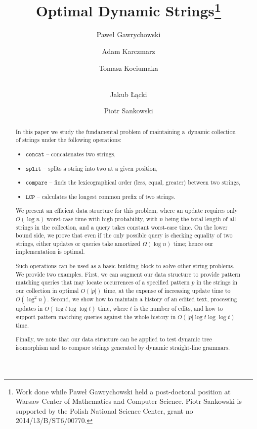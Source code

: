 \documentclass[a4paper]{article}
\theoremstyle{remark}
\newcommand{\compop}{\mathtt{compare}}
\newcommand{\concop}{\mathtt{concat}}
\newcommand{\splitop}{\mathtt{split}}
\newcommand{\lcpop}{\mathtt{LCP}}
\begin{document}
\begin{titlepage}
\date{}
\title{Optimal Dynamic Strings\thanks{Work done while Paweł Gawrychowski held a post-doctoral position at  Warsaw  Center  of
Mathematics and Computer Science. Piotr Sankowski is supported by the Polish National Science Center, grant no 2014/13/B/ST6/00770.}}

\author[1]{Paweł Gawrychowski}
\author[1]{Adam Karczmarz}
\author[1]{Tomasz Kociumaka}
\author[2]{\\Jakub Łącki}
\author[1]{Piotr Sankowski}


\maketitle
\thispagestyle{empty}


\begin{abstract}
In this paper we study the fundamental problem of maintaining
a~dynamic collection of strings under the following operations:
\begin{itemize}
\item $\concop$ -- concatenates two strings,
\item $\splitop$ -- splits a string into two at a given position,
\item $\compop$ -- finds the lexicographical order (less, equal, greater) between two strings,
\item $\lcpop$ -- calculates the longest common prefix of two strings.
\end{itemize}
We present an efficient data structure for this problem, where an update requires
only $O(\log n)$ worst-case time with high probability, with $n$ being the total length of all strings
in the collection, and a query takes constant worst-case time.
On the lower bound side, we prove that even if the only possible query is checking equality of
two strings, either updates or queries take amortized $\Omega(\log n)$ time; hence
our implementation is optimal.

Such operations can be used as a basic building block to solve other string problems.
We provide two examples. First, we can augment our data structure to provide
pattern matching queries that may locate occurrences of a specified pattern $p$ in the
strings in our collection in optimal $O(|p|)$ time, at the expense of increasing update time to $O(\log^2 n)$.
Second, we show how to maintain a history of an edited text, processing updates in $O(\log t \log \log t)$ time,
where $t$ is the number of edits, and how to support pattern matching queries against the whole
history in $O(|p| \log t \log \log t)$ time. 

Finally, we note that our data structure can be applied to test dynamic tree isomorphism
and to compare strings generated by dynamic straight-line grammars. 
\end{abstract}
\end{titlepage}
\newpage
\end{document}
